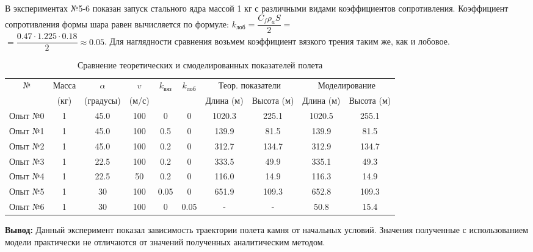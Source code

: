 В экспериментах №5-6 показан запуск стального ядра массой 1 кг с различными видами коэффициентов сопротивления. Коэффициент сопротивления формы шара равен вычисляется по формуле: $k_{\text{лоб} }= \dfrac{C_f \rho_a S}{2} = $ \\ $= \dfrac{0.47 \cdot 1.225 \cdot 0.18}{2} \approx 0.05$. Для наглядности сравнения возьмем коэффициент вязкого трения таким же, как и лобовое.
\newpage
\begin{table}[h]
\centering
\footnotesize
\caption{Сравнение теоретических и смоделированных показателей полета}
\begin{tabular}{|c|c|c|c|c|c|c|c|c|c|}
\hline
№ & Масса & $\alpha$ & $v$ & \multirow{2}{*}{$k_{\text{вяз}}$} & \multirow{2}{*}{$k_{\text{лоб}}$} & \multicolumn{2}{c|}{Теор. показатели} & \multicolumn{2}{c|}{Моделирование} \\
\cline{7-10}
   & (кг) & (градусы) & (м/с) & & & Длина (м) & Высота (м) & Длина (м) & Высота (м) \\
\hline
Опыт №0 & 1 & 45.0 & 100 & 0 & 0 & 1020.3 & 225.1 & 1020.5 & 255.1 \\
Опыт №1 & 1 & 45.0 & 100 & 0.5 & 0 & 139.9 & 81.5 & 139.9 & 81.5 \\
Опыт №2 & 1 & 45.0 & 100 & 0.2 & 0 & 312.7 & 134.7 & 312.9 & 134.7 \\
Опыт №3 & 1 & 22.5 & 100 & 0.2 & 0 & 333.5 & 49.9 & 335.1 & 49.3 \\
Опыт №4 & 1 & 22.5 & 50 & 0.2 & 0 & 116.0 & 14.9 & 116.3 & 14.9 \\
\hline
Опыт №5 & 1 & 30 & 100 & 0.05 & 0 & 651.9 & 109.3 & 652.8 & 109.3 \\
Опыт №6 & 1 & 30 & 100 & 0  & 0.05 & - & - & 50.8 & 15.4 \\
\hline
\end{tabular}
\end{table}
\noindent \textbf{Вывод:} Данный эксперимент показал зависимость траектории полета камня от начальных условий. Значения полученные с использованием модели практически не отличаются от значений полученных аналитическим методом.
